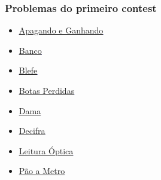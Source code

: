 \documentclass{beamer}
\begin{document}
	\begin{frame}
	\frametitle{Problemas do primeiro contest}
	\begin{itemize}
	\item \textcolor{blue}{\underline{\href{https://www.urionlinejudge.com.br/judge/pt/problems/view/1084}{Apagando e Ganhando}}}
	\item \textcolor{blue}{\underline{\href{https://www.urionlinejudge.com.br/judge/pt/problems/view/2425}{Banco}}}
	\item \textcolor{blue}{\underline{\href{https://www.urionlinejudge.com.br/judge/pt/problems/view/2461}{Blefe}}}
	\item \textcolor{blue}{\underline{\href{https://www.urionlinejudge.com.br/judge/pt/problems/view/1245}{Botas Perdidas}}}
	\item \textcolor{blue}{\underline{\href{https://www.urionlinejudge.com.br/judge/pt/problems/view/1087}{Dama}}}
	\item \textcolor{blue}{\underline{\href{https://www.urionlinejudge.com.br/judge/pt/problems/view/2464}{Decifra}}}
	\item \textcolor{blue}{\underline{\href{https://www.urionlinejudge.com.br/judge/pt/problems/view/1129}{Leitura \'Optica}}}
	\item \textcolor{blue}{\underline{\href{https://www.urionlinejudge.com.br/judge/pt/problems/view/2329}{P\~ao a Metro}}}
	\end{itemize}
	\end{frame}
\end{document}
